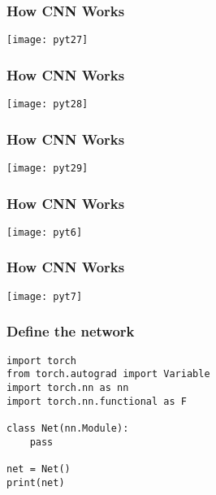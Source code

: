 \begin{frame}[fragile] \frametitle{How CNN Works}
\begin{center}
\texttt{[image: pyt27]}
\end{center}

\end{frame}


\begin{frame}[fragile] \frametitle{How CNN Works}
\begin{center}
\texttt{[image: pyt28]}
\end{center}

\end{frame}
\begin{frame}[fragile] \frametitle{How CNN Works}
\begin{center}
\texttt{[image: pyt29]}
\end{center}

\end{frame}


\begin{frame}[fragile] \frametitle{How CNN Works}
\begin{center}
\texttt{[image: pyt6]}
\end{center}

\end{frame}

\begin{frame}[fragile] \frametitle{How CNN Works}
\begin{center}
\texttt{[image: pyt7]}
\end{center}

\end{frame}


\begin{frame}[fragile] \frametitle{Define the network}
\begin{lstlisting}
import torch
from torch.autograd import Variable
import torch.nn as nn
import torch.nn.functional as F

class Net(nn.Module):
	pass
	
net = Net()
print(net)
\end{lstlisting}
\end{frame}

